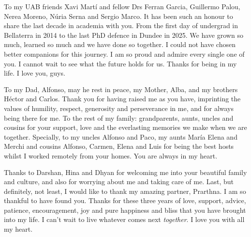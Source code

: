 To my UAB friends Xavi Martí and fellow Drs Ferran Garcia, Guillermo Palou, Nerea Moreno, Núria Serna and Sergio Marco. It has been such an honour to share the last decade in academia with you. From the first day of undergrad in Bellaterra in 2014 to the last PhD defence in Dundee in 2025. We have grown so much, learned so much and we have done so together. I could not have chosen better companions for this journey. I am so proud and admire every single one of you. I cannot wait to see what the future holds for us. Thanks for being in my life. I love you, guys.

To my Dad, Alfonso, may he rest in peace, my Mother, Alba, and my brothers Héctor and Carlos. Thank you for having raised me as you have, imprinting the values of humility, respect, generosity and perseverance in me, and for always being there for me. To the rest of my family: grandparents, aunts, uncles and cousins for your support, love and the everlasting memories we make when we are together. Specially, to my uncles Alfonso and Paco, my aunts María Elena and Merchi and cousins Alfonso, Carmen, Elena and Luis for being the best hosts whilst I worked remotely from your homes. You are always in my heart.

Thanks to Darshan, Hina and Dhyan for welcoming me into your beautiful family and culture, and also for worrying about me and taking care of me. Last, but definitely, not least, I would like to thank my amazing partner, Prarthna. I am so thankful to have found you. Thanks for these three years of love, support, advice, patience, encouragement, joy and pure happiness and bliss that you have brought into my life. I can't wait to live whatever comes next \textit{together}. I love you with all my heart.
















